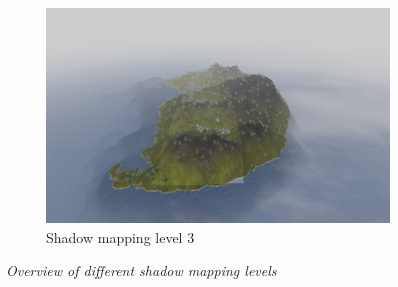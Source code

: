 \begin{figure}[H]
\begin{subfigure}{\textwidth/3}
  \centering
  \includegraphics[width=0.9\linewidth]{images/SMOverViewLvl3.jpg}
  \caption{Shadow mapping level 3}
  \label{fig:SMOverViewLvl3}
\end{subfigure}
\caption[Shadow Mapping Levels, Overview]{\textit{Overview of different shadow mapping levels}}
\label{fig:SMOverViewComparison}
\end{figure}

